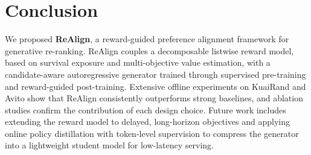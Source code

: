 \documentclass[sigconf]{acmart}
\begin{document}


\section{Conclusion}

We proposed \textbf{ReAlign}, a reward-guided preference alignment framework for generative re-ranking. ReAlign couples a decomposable listwise reward model, based on survival exposure and multi-objective value estimation, with a candidate-aware autoregressive generator trained through supervised pre-training and reward-guided post-training. Extensive offline experiments on KuaiRand and Avito show that ReAlign consistently outperforms strong baselines, and ablation studies confirm the contribution of each design choice. Future work includes extending the reward model to delayed, long-horizon objectives and applying online policy distillation with token-level supervision to compress the generator into a lightweight student model for low-latency serving.


\newpage


\end{document}
